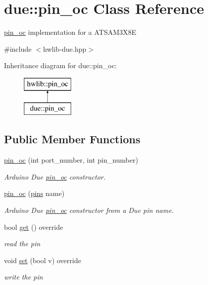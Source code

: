 \hypertarget{classdue_1_1pin__oc}{}\section{due\+:\+:pin\+\_\+oc Class Reference}
\label{classdue_1_1pin__oc}


\hyperlink{classdue_1_1pin__oc}{pin\+\_\+oc} implementation for a A\+T\+S\+A\+M3\+X8E  




{\ttfamily \#include $<$hwlib-\/due.\+hpp$>$}

Inheritance diagram for due\+:\+:pin\+\_\+oc\+:\begin{figure}[H]
\begin{center}
\leavevmode
\includegraphics[height=2.000000cm]{classdue_1_1pin__oc}
\end{center}
\end{figure}
\subsection*{Public Member Functions}
\begin{DoxyCompactItemize}
\item 
\hyperlink{classdue_1_1pin__oc_a104511f36b1b493b8164fc91e2a160c3}{pin\+\_\+oc} (int port\+\_\+number, int pin\+\_\+number)
\begin{DoxyCompactList}\small\item\em Arduino Due \hyperlink{classdue_1_1pin__oc}{pin\+\_\+oc} constructor. \end{DoxyCompactList}\item 
\hyperlink{classdue_1_1pin__oc_a26daecda4236219f16e896cb82e9e6aa}{pin\+\_\+oc} (\hyperlink{namespacedue_a8ffa3ec309934ff9db34317e504bcc92}{pins} name)
\begin{DoxyCompactList}\small\item\em Arduino Due \hyperlink{classdue_1_1pin__oc}{pin\+\_\+oc} constructor from a Due pin name. \end{DoxyCompactList}\item 
bool \hyperlink{classdue_1_1pin__oc_a7d90e525b3531e099e5ced6f531dff81}{get} () override
\begin{DoxyCompactList}\small\item\em read the pin \end{DoxyCompactList}\item 
void \hyperlink{classdue_1_1pin__oc_acfeab83375e9620804e87d695d3ea3b4}{set} (bool v) override
\begin{DoxyCompactList}\small\item\em write the pin \end{DoxyCompactList}\end{DoxyCompactItemize}



